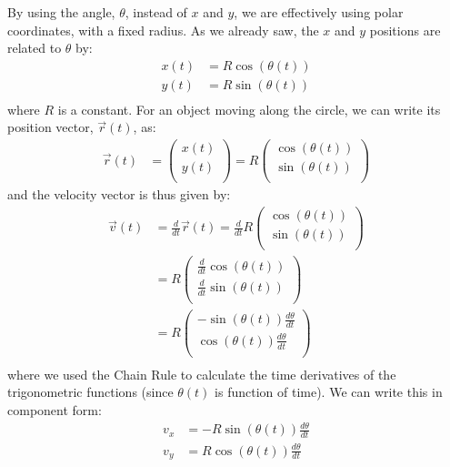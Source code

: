 By using the angle, $\theta$, instead of $x$ and $y$, we are effectively using polar coordinates, with a fixed radius. As we already saw, the $x$ and $y$ positions are related to $\theta$ by:
\begin{align*}
x(t) &= R\cos(\theta(t))\\
y(t) &= R\sin(\theta(t))\\
\end{align*}
where $R$ is a constant. For an object moving along the circle, we can write its position vector, $\vec r(t)$, as:
\begin{align*}
\vec r(t)&= \begin{pmatrix}
           x(t) \\
           y(t) \\
         \end{pmatrix}
         =R \begin{pmatrix}
           \cos(\theta(t)) \\
           \sin(\theta(t)) \\
         \end{pmatrix}
\end{align*}
and the velocity vector is thus given by:
\begin{align*}
\vec v(t) &=\frac{d}{dt}\vec r(t) 
=\frac{d}{dt} R \begin{pmatrix}
           \cos(\theta(t)) \\
           \sin(\theta(t)) \\
         \end{pmatrix} \\
&= R \begin{pmatrix}
           \frac{d}{dt}\cos(\theta(t)) \\
           \frac{d}{dt}\sin(\theta(t)) \\
         \end{pmatrix} \\
 &= R \begin{pmatrix}
           -\sin(\theta(t))\frac{d\theta}{dt} \\
           \cos(\theta(t))\frac{d\theta}{dt} \\
         \end{pmatrix}     \\  
\end{align*}         
where we used the Chain Rule to calculate the time derivatives of the trigonometric functions (since $\theta(t)$ is function of time). We can write this in component form:
\begin{align}
\label{eqn:describingmotioninnd:vcircle}
v_x &= -R\sin(\theta(t))\frac{d\theta}{dt}\nonumber\\
v_y &= R\cos(\theta(t))\frac{d\theta}{dt}
\end{align}
